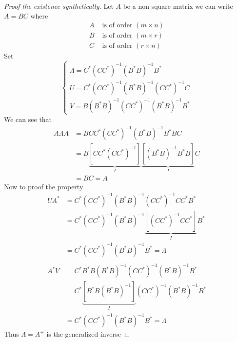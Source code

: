\begin{proof}[\textcolor{theme}{Proof the existence synthetically}]
    Let $A$ be a non square matrix we can write $A = BC$ where
    \begin{align*}
        A & \text{ is of order } (m\times n)
        \\
        B & \text{ is of order } (m\times r)
        \\
        C & \text{ is of order } (r\times n)
    \end{align*}
    Set
    \begin{equation*}
        \begin{cases}
            \displaystyle \Lambda = C^{*}(CC^{*})^{-1}(B^{*}B)^{-1}B^{*}
            \\
            \displaystyle U = C^{*}(CC^{*})^{-1}(B^{*}B)^{-1}(CC^{*})^{-1}C
            \\
            \displaystyle V = B(B^{*}B)^{-1}(CC^{*})^{-1}(B^{*}B)^{-1}B^{*}
        \end{cases}
    \end{equation*}
    We can see that
    \begin{align*}
        A\Lambda A & = BCC^{*}(CC^{*})^{-1}(B^{*}B)^{-1}B^{*}BC
        \\
                   & = B\underbrace{\left[CC^{*}(CC^{*})^{-1}\right]}_{I}\underbrace{\left[(B^{*}B)^{-1}B^{*}B\right]}_{I}C
        \\
                   & = BC = A
    \end{align*}
    Now to proof the property 
    \begin{align*}
        UA^* & =  C^{*}(CC^{*})^{-1}(B^{*}B)^{-1}(CC^{*})^{-1}C C^* B^*
        \\
             & =  C^{*}(CC^{*})^{-1}(B^{*}B)^{-1}\underbrace{\left[(CC^{*})^{-1}C C^*\right]}_{I} B^*
        \\
             & = C^{*}(CC^{*})^{-1}(B^{*}B)^{-1}B^* = \Lambda
        \\
        \\
        A^*V & =  C^* B^*B(B^{*}B)^{-1}(CC^{*})^{-1}(B^{*}B)^{-1}B^{*}
        \\
             & =  C^{*}\underbrace{\left[B^*B(B^{*}B)^{-1}\right]}_{I}(CC^{*})^{-1}(B^{*}B)^{-1}B^{*}
        \\
             & = C^{*}(CC^{*})^{-1}(B^{*}B)^{-1}B^* = \Lambda
    \end{align*}
    Thus $\Lambda = A^{+} $ is the generalized inverse
\end{proof}
